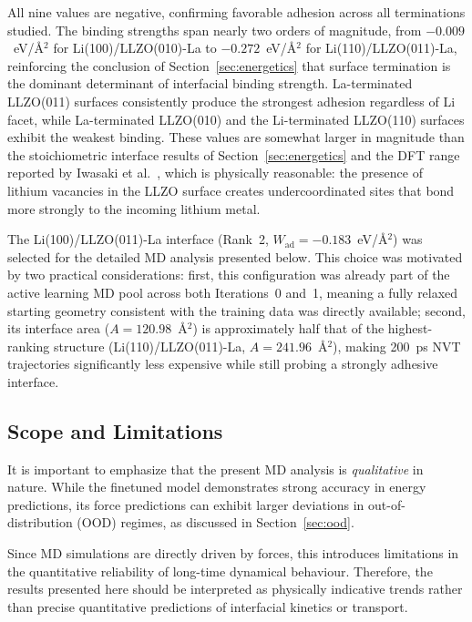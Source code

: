 \documentclass[12pt,a4paper,oneside]{book}
\begin{document}
All nine values are negative, confirming favorable adhesion across all terminations
studied. The binding strengths span nearly two orders of magnitude, from
$-0.009$~eV/\AA$^2$ for Li(100)/LLZO(010)-La to $-0.272$~eV/\AA$^2$ for
Li(110)/LLZO(011)-La, reinforcing the conclusion of Section~\ref{sec:energetics}
that surface termination is the dominant determinant of interfacial binding strength.
La-terminated LLZO(011) surfaces consistently produce the strongest adhesion
regardless of Li facet, while La-terminated LLZO(010) and the Li-terminated
LLZO(110) surfaces exhibit the weakest binding. These values are somewhat larger
in magnitude than the stoichiometric interface results of Section~\ref{sec:energetics}
and the DFT range reported by Iwasaki et al.~\cite{Iwasaki2022DFT_Li_LLZO_PSSB},
which is physically reasonable: the presence of lithium vacancies in the LLZO
surface creates undercoordinated sites that bond more strongly to the incoming
lithium metal.

The Li(100)/LLZO(011)-La interface (Rank~2, $W_{\mathrm{ad}} = -0.183$~eV/\AA$^2$)
was selected for the detailed MD analysis presented below. This choice was motivated
by two practical considerations: first, this configuration was already part of the
active learning MD pool across both Iterations~0 and~1, meaning a fully relaxed
starting geometry consistent with the training data was directly available; second,
its interface area ($A = 120.98$~\AA$^2$) is approximately half that of the
highest-ranking structure (Li(110)/LLZO(011)-La, $A = 241.96$~\AA$^2$), making
200~ps NVT trajectories significantly less expensive while still probing a strongly
adhesive interface.

\subsection{Scope and Limitations}

It is important to emphasize that the present MD analysis is \textit{qualitative} in nature. While the finetuned model demonstrates strong accuracy in energy predictions, its force predictions can exhibit larger deviations in out-of-distribution (OOD) regimes, as discussed in Section~\ref{sec:ood}.

Since MD simulations are directly driven by forces, this introduces limitations in the quantitative reliability of long-time dynamical behaviour. Therefore, the results presented here should be interpreted as physically indicative trends rather than precise quantitative predictions of interfacial kinetics or transport.
\end{document}
